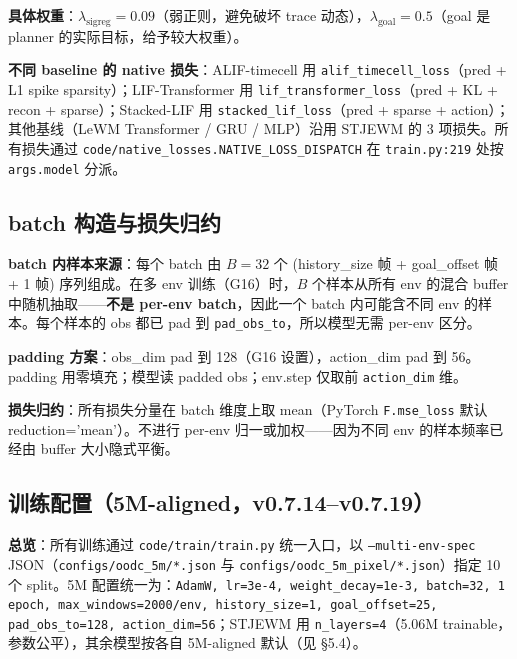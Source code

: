 \documentclass[11pt,a4paper]{article}
\begin{document}
\textbf{具体权重}：$\lambda_{\text{sigreg}} = 0.09$（弱正则，避免破坏 trace 动态），$\lambda_{\text{goal}} = 0.5$（goal 是 planner 的实际目标，给予较大权重）。

\textbf{不同 baseline 的 native 损失}：ALIF-timecell 用 \texttt{alif\_timecell\_loss}（pred + L1 spike sparsity）；LIF-Transformer 用 \texttt{lif\_transformer\_loss}（pred + KL + recon + sparse）；Stacked-LIF 用 \texttt{stacked\_lif\_loss}（pred + sparse + action）；其他基线（LeWM Transformer / GRU / MLP）沿用 STJEWM 的 3 项损失。所有损失通过 \texttt{code/native\_losses.NATIVE\_LOSS\_DISPATCH} 在 \texttt{train.py:219} 处按 \texttt{args.model} 分派。

\subsection{batch 构造与损失归约}

\textbf{batch 内样本来源}：每个 batch 由 $B = 32$ 个 (history\_size 帧 + goal\_offset 帧 + 1 帧) 序列组成。在多 env 训练（G16）时，$B$ 个样本从所有 env 的混合 buffer 中随机抽取——\textbf{不是 per-env batch}，因此一个 batch 内可能含不同 env 的样本。每个样本的 obs 都已 pad 到 \texttt{pad\_obs\_to}，所以模型无需 per-env 区分。

\textbf{padding 方案}：obs\_dim pad 到 128（G16 设置），action\_dim pad 到 56。padding 用零填充；模型读 padded obs；env.step 仅取前 \texttt{action\_dim} 维。

\textbf{损失归约}：所有损失分量在 batch 维度上取 mean（PyTorch \texttt{F.mse\_loss} 默认 reduction='mean'）。不进行 per-env 归一或加权——因为不同 env 的样本频率已经由 buffer 大小隐式平衡。
\subsection{训练配置（5M-aligned，v0.7.14--v0.7.19）}

\textbf{总览}：所有训练通过 \texttt{code/train/train.py} 统一入口，以 \texttt{--multi-env-spec} JSON（\texttt{configs/oodc\_5m/*.json} 与 \texttt{configs/oodc\_5m\_pixel/*.json}）指定 10 个 split。5M 配置统一为：\texttt{AdamW, lr=3e-4, weight\_decay=1e-3, batch=32, 1 epoch, max\_windows=2000/env, history\_size=1, goal\_offset=25, pad\_obs\_to=128, action\_dim=56}；STJEWM 用 \texttt{n\_layers=4}（5.06M trainable，参数公平），其余模型按各自 5M-aligned 默认（见 §5.4）。
\end{document}

